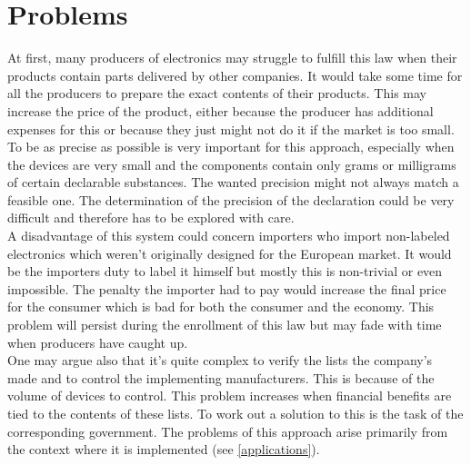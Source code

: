 \section{Problems}
At first, many producers of electronics may struggle to fulfill this law when their products contain parts delivered by other companies. It would take some time for all the producers to prepare the exact contents of their products. This may increase the price of the product, either because the producer has additional expenses for this or because they just might not do it if the market is too small.\\
To be as precise as possible is very important for this approach, especially when the devices are very small and the components contain only grams or milligrams of certain declarable substances. The wanted precision might not always match a feasible one. The determination of the precision of the declaration could be very difficult and therefore has to be explored with care.\\
A disadvantage of this system could concern importers who import non-labeled electronics which weren't originally designed for the European market. It would be the importers duty to label it himself but mostly this is non-trivial or even impossible. The penalty the importer had to pay would increase the final price for the consumer which is bad for both the consumer and the economy. This problem will persist during the enrollment of this law but may fade with time when producers have caught up.\\
One may argue also that it's quite complex to verify the lists the company’s made and to control the implementing manufacturers. This is because of the volume of devices to control. This problem increases when financial benefits are tied to the contents of these lists. To work out a solution to this is the task of the corresponding government.
The problems of this approach arise primarily from the context where it is implemented (see \ref{applications}).